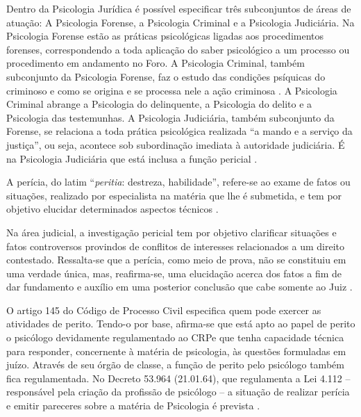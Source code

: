 Dentro da Psicologia Jurídica é possível especificar três subconjuntos de áreas de atuação: A Psicologia Forense, a Psicologia Criminal e a Psicologia Judiciária. Na Psicologia Forense estão as práticas psicológicas ligadas aos procedimentos forenses, correspondendo a toda aplicação do saber psicológico a um processo ou procedimento em andamento no Foro. A Psicologia Criminal, também subconjunto da Psicologia Forense, faz o estudo das condições psíquicas do criminoso e como se origina e se processa nele a ação criminosa . A Psicologia Criminal abrange a Psicologia do delinquente, a Psicologia do delito e a Psicologia das testemunhas. A Psicologia Judiciária, também subconjunto da Forense, se relaciona a toda prática psicológica realizada ``a mando e a serviço da justiça'', ou seja, acontece sob subordinação imediata à autoridade judiciária. É na Psicologia Judiciária que está inclusa a função pericial \cite{LEAL2008}.

A perícia, do latim ``\emph{peritia}: destreza, habilidade'', refere-se ao exame de fatos ou situações, realizado por especialista na matéria que lhe é submetida, e tem por objetivo elucidar determinados aspectos técnicos .

Na área judicial, a investigação pericial tem por objetivo clarificar situações e fatos controversos provindos de conflitos de interesses relacionados a um direito contestado. Ressalta-se que a perícia, como meio de prova, não se constituiu em uma verdade única, mas, reafirma-se, uma elucidação acerca dos fatos a fim de dar fundamento e auxílio em uma posterior conclusão que cabe somente ao Juiz \cite{ROVINSKI2004}.

O artigo 145 do Código de Processo Civil especifica quem pode exercer as atividades de perito. Tendo-o por base, afirma-se que está apto ao papel de perito o psicólogo devidamente regulamentado ao CRP\footnotemark e que tenha capacidade técnica para responder, concernente à matéria de psicologia, às questões formuladas em juízo. Através de seu órgão de classe, a função de perito pelo psicólogo também fica regulamentada. No Decreto 53.964 (21.01.64), que regulamenta a Lei 4.112 --  responsável pela criação da profissão de psicólogo -- a situação de realizar perícia e emitir pareceres sobre a matéria de Psicologia é prevista \cite{ROVINSKI2004}.


